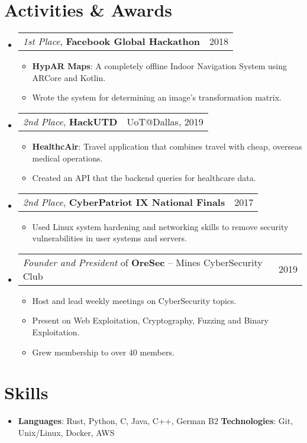 \documentclass[letterpaper,11pt]{article}
\makeatletter
\newcommand{\resumeItem}[1]{
  \item\small{
    {#1 \vspace{-2pt}}
  }
}
\newcommand{\awardSubheading}[2]{
  \vspace{-1pt}\item
    \begin{tabular*}{0.97\textwidth}[t]{l@{\extracolsep{\fill}}r}
      \small #1 & \small #2 \\
    \end{tabular*}\vspace{-8pt}
}
\newcommand{\resumeSubHeadingListStart}{\begin{itemize}[leftmargin=*]}
\newcommand{\resumeSubHeadingListEnd}{\end{itemize}}
\newcommand{\resumeItemListStart}{\begin{itemize}}
\newcommand{\resumeItemListEnd}{\end{itemize}\vspace{-10pt}}
\makeatother
\begin{document}
\section{Activities \& Awards}
  \resumeSubHeadingListStart
    \awardSubheading
      {\textit{1st Place}, \textbf{Facebook Global Hackathon}}{2018}
      \resumeItemListStart
        \resumeItem
          {\textbf{HypAR Maps}: A completely offline Indoor Navigation System using ARCore and Kotlin.}
        \resumeItem
          {Wrote the system for determining an image’s transformation matrix.}
      \resumeItemListEnd
    \awardSubheading
      {\textit{2nd Place}, \textbf{HackUTD}}{UoT@Dallas, 2019}
      \resumeItemListStart
        \resumeItem
          {\textbf{HealthcAir}: Travel application that combines travel with cheap, overseas medical operations.}
        \resumeItem
          {Created an API that the backend queries for healthcare data.}
      \resumeItemListEnd
    \awardSubheading
      {\textit{2nd Place}, \textbf{CyberPatriot IX National Finals}}{2017}
      \resumeItemListStart
        \resumeItem
          {Used Linux system hardening and networking skills to remove security vulnerabilities in user systems and servers.}
      \resumeItemListEnd
    \awardSubheading
    {\textit{Founder and President} of \textbf{OreSec} -- Mines CyberSecurity Club}{2019}
    \resumeItemListStart
      \resumeItem
        {Host and lead weekly meetings on CyberSecurity topics.}
      \resumeItem
        {Present on Web Exploitation, Cryptography, Fuzzing and Binary Exploitation.}
      \resumeItem
        {Grew membership to over 40 members.}
    \resumeItemListEnd
  \resumeSubHeadingListEnd
\vspace{-15pt} %

\section{Skills}
  \resumeSubHeadingListStart
    \item{
      \textbf{Languages}{: Rust, Python, C, Java, C++, German B2}
      \hfill
      \textbf{Technologies}{: Git, Unix/Linux, Docker, AWS}
    }
    \vspace{-10pt}
    
  \resumeSubHeadingListEnd


%


\end{document}
